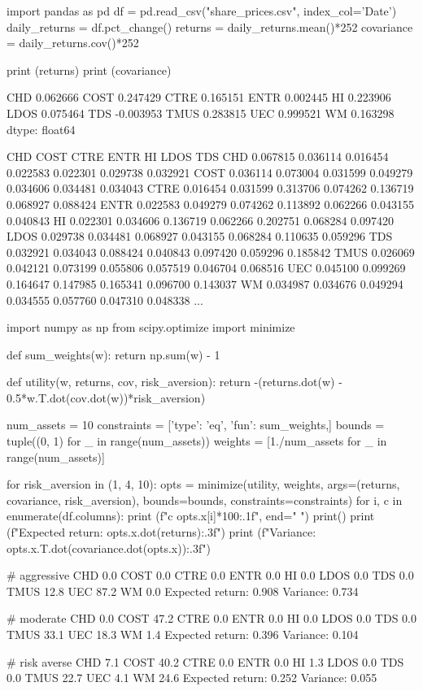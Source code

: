 \cprotEnv \begin{solution}
\begin{ipython}
import pandas as pd
df = pd.read_csv("share_prices.csv", index_col='Date')
daily_returns = df.pct_change()
returns = daily_returns.mean()*252
covariance = daily_returns.cov()*252

print (returns)
print (covariance)
\end{ipython}
\begin{ioutput}
CHD     0.062666
COST    0.247429
CTRE    0.165151
ENTR    0.002445
HI      0.223906
LDOS    0.075464
TDS    -0.003953
TMUS    0.283815
UEC     0.999521
WM      0.163298
dtype: float64

           CHD     COST       CTRE      ENTR        HI      LDOS       TDS
CHD   0.067815  0.036114  0.016454  0.022583  0.022301  0.029738  0.032921   
COST  0.036114  0.073004  0.031599  0.049279  0.034606  0.034481  0.034043   
CTRE  0.016454  0.031599  0.313706  0.074262  0.136719  0.068927  0.088424   
ENTR  0.022583  0.049279  0.074262  0.113892  0.062266  0.043155  0.040843   
HI    0.022301  0.034606  0.136719  0.062266  0.202751  0.068284  0.097420   
LDOS  0.029738  0.034481  0.068927  0.043155  0.068284  0.110635  0.059296   
TDS   0.032921  0.034043  0.088424  0.040843  0.097420  0.059296  0.185842   
TMUS  0.026069  0.042121  0.073199  0.055806  0.057519  0.046704  0.068516   
UEC   0.045100  0.099269  0.164647  0.147985  0.165341  0.096700  0.143037   
WM    0.034987  0.034676  0.049294  0.034555  0.057760  0.047310  0.048338   
...
\end{ioutput}
\begin{ipython}
import numpy as np
from scipy.optimize import minimize

def sum_weights(w): 
    return np.sum(w) - 1

def utility(w, returns, cov, risk_aversion):
    return -(returns.dot(w) - 0.5*w.T.dot(cov.dot(w))*risk_aversion)

num_assets = 10
constraints = [{'type': 'eq', 'fun': sum_weights},] 
bounds = tuple((0, 1) for _ in range(num_assets))
weights = [1./num_assets for _ in range(num_assets)]

for risk_aversion in (1, 4, 10):
  opts = minimize(utility, weights, args=(returns, covariance, risk_aversion),
                bounds=bounds, constraints=constraints)
  for i, c in enumerate(df.columns):
    print (f"{c} {opts.x[i]*100:.1f}", end=" ")
  print()
  print (f"Expected return: {opts.x.dot(returns):.3f}")
  print (f"Variance: {opts.x.T.dot(covariance.dot(opts.x)):.3f}")
\end{ipython}
\begin{ioutput}
# aggressive
CHD 0.0 COST 0.0 CTRE 0.0 ENTR 0.0 HI 0.0 LDOS 0.0 TDS 0.0 TMUS 12.8 UEC 87.2 WM 0.0 
Expected return: 0.908
Variance: 0.734

# moderate
CHD 0.0 COST 47.2 CTRE 0.0 ENTR 0.0 HI 0.0 LDOS 0.0 TDS 0.0 TMUS 33.1 UEC 18.3 WM 1.4 
Expected return: 0.396
Variance: 0.104

# risk averse
CHD 7.1 COST 40.2 CTRE 0.0 ENTR 0.0 HI 1.3 LDOS 0.0 TDS 0.0 TMUS 22.7 UEC 4.1 WM 24.6 
Expected return: 0.252
Variance: 0.055
\end{ioutput}
\end{solution}

